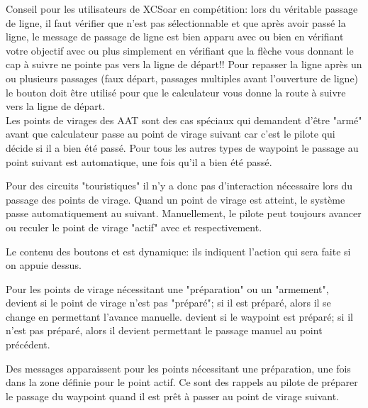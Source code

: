 \tip Conseil pour les  utilisateurs de XCSoar en compétition: lors du véritable passage de ligne, il faut vérifier que  \blink{} n'est pas sélectionnable et que après avoir passé la ligne, le message de passage de ligne est bien apparu avec \blink{} ou bien en vérifiant votre objectif avec \blink{}\blink{} ou plus simplement en vérifiant que la flèche vous donnant le cap à suivre ne pointe pas vers la ligne de départ!!
 Pour repasser la ligne après un ou plusieurs passages (faux départ, passages multiples avant l'ouverture de ligne) le bouton \blink{} doit être utilisé pour que le calculateur vous donne la route à suivre vers la ligne de départ.\\
Les points de virages des AAT sont des cas spéciaux qui demandent d'être "armé" avant que calculateur passe au point de virage suivant car c'est le pilote qui décide si il a bien été passé. Pour tous les autres types de waypoint le passage au point suivant est automatique, une fois qu'il a bien été passé.

Pour des circuits "touristiques" il n'y a donc pas d'interaction nécessaire lors du passage des points de virage. Quand un point de virage est atteint, le système passe automatiquement au suivant. Manuellement, le pilote peut toujours avancer ou reculer le point de virage "actif" avec \blink{} et \blink{} respectivement.

Le contenu des boutons   et  est dynamique: ils indiquent l'action qui sera faite si on appuie dessus.

Pour les points de virage nécessitant une "préparation" ou un "armement", \blink{}  devient  si le point de virage n'est pas "préparé"; si il est préparé, alors il se change en  permettant l'avance manuelle.   \blink{} devient   si le waypoint est préparé; si il n'est pas préparé, alors il devient  permettant le passage manuel au point précédent.

Des messages apparaissent pour les points nécessitant une préparation, une fois dans la zone définie pour le point actif. Ce sont des rappels au pilote de préparer le passage du waypoint quand il est prêt à passer au point de virage suivant.


